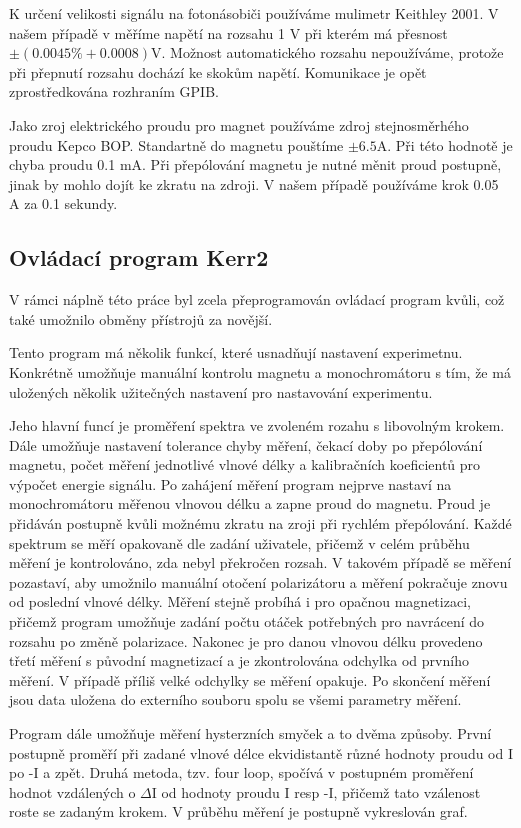 K určení velikosti signálu na fotonásobiči používáme mulimetr Keithley 2001. V našem případě v měříme napětí na rozsahu 1 V při kterém má přesnost $\pm(0.0045\%+0.0008)$V. Možnost automatického rozsahu nepoužíváme, protože při přepnutí rozsahu dochází ke skokům napětí. Komunikace je opět zprostředkována rozhraním GPIB.

Jako zroj elektrického proudu pro magnet používáme zdroj stejnosměrhého proudu Kepco BOP. Standartně do magnetu pouštíme $\pm 6.5$A. Při této hodnotě je chyba proudu 0.1 mA. Při přepólování magnetu je nutné měnit proud postupně, jinak by mohlo dojít ke zkratu na zdroji. V našem případě používáme krok 0.05 A za 0.1 sekundy.

\subsection{Ovládací program Kerr2}
V rámci náplně této práce byl zcela přeprogramován ovládací program kvůli, což také umožnilo obměny přístrojů za novější.

Tento program má několik funkcí, které usnadňují nastavení experimetnu. Konkrétně umožňuje manuální kontrolu magnetu a monochromátoru s tím, že má uložených několik užitečných nastavení pro nastavování experimentu.

Jeho hlavní funcí je proměření spektra ve zvoleném rozahu s libovolným krokem. Dále umožňuje nastavení tolerance chyby měření, čekací doby po přepólování magnetu, počet měření jednotlivé vlnové délky a kalibračních koeficientů pro výpočet energie signálu. Po zahájení měření program nejprve nastaví na monochromátoru měřenou vlnovou délku a zapne proud do magnetu. Proud je přidáván postupně kvůli možnému zkratu na zroji při rychlém přepólování. Každé spektrum se měří opakovaně dle zadání uživatele, přičemž v celém průběhu měření je kontrolováno, zda nebyl překročen rozsah. V takovém případě se měření pozastaví, aby umožnilo manuální otočení polarizátoru a měření pokračuje znovu od poslední vlnové délky. Měření stejně probíhá i pro opačnou magnetizaci, přičemž program umožňuje zadání počtu otáček potřebných pro navrácení do rozsahu po změně polarizace. Nakonec je pro danou vlnovou délku provedeno třetí měření s původní magnetizací a je zkontrolována odchylka od prvního měření. V případě příliš velké odchylky se měření opakuje. Po skončení měření jsou data uložena do externího souboru spolu se všemi parametry měření.

Program dále umožňuje měření hysterzních smyček a to dvěma způsoby. První postupně proměří při zadané vlnové délce ekvidistantě různé hodnoty proudu od I po -I a zpět. Druhá metoda, tzv. four loop, spočívá v postupném proměření hodnot vzdálených o $\Delta$I od hodnoty proudu I resp -I, přičemž tato vzálenost roste se zadaným krokem. V průběhu měření je postupně vykreslován graf.
